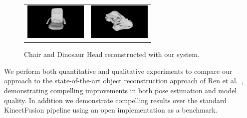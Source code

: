 \begin{figure}[!t]
	\centering
	\begin{tabular}{cc}
		\includegraphics[width=3cm]{screenshots/untextured/chair00.png}&
		\includegraphics[width=3cm]{screenshots/untextured/dino00.png}
	\end{tabular}
	\vspace{-3mm}
	\caption{
		Chair and Dinosaur Head reconstructed with our system.
	}
	\label{fig:demo}
\end{figure}
We perform both quantitative and qualitative experiments to compare our approach to the state-of-the-art object reconstruction approach of Ren et al.\ \cite{Ren2013}, demonstrating compelling improvements in both pose estimation and model quality. In addition we demonstrate compelling results over the standard KinectFusion pipeline using an open implementation \cite{Prisacariu2014} as a benchmark.

